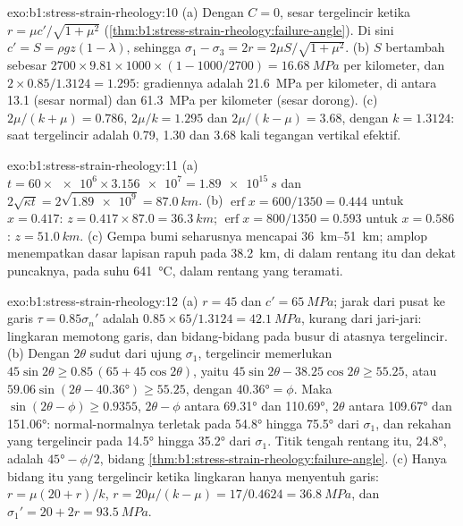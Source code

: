 \begin{solution}{exo:b1:stress-strain-rheology:10}
(a) Dengan $C = 0$, sesar tergelincir ketika $r = \mu c'/\sqrt{1+\mu^2}$
(\cref{thm:b1:stress-strain-rheology:failure-angle}). Di sini $c' = S =
\rho g z(1-\lambda)$, sehingga $\sigma_1 - \sigma_3 = 2r = 2\mu S/\sqrt{1+\mu^2}$.
(b) $S$ bertambah sebesar $2700\times9.81\times1000\times(1 - 1000/2700) =
\qty{16.68}{MPa}$ per kilometer, dan $2\times0.85/1.3124 = 1.295$: gradiennya
adalah \qty{21.6}{MPa} per kilometer, di antara \num{13.1} (sesar normal) dan
\qty{61.3}{MPa} per kilometer (sesar dorong). (c) $2\mu/(k+\mu) = 0.786$,
$2\mu/k = 1.295$ dan $2\mu/(k-\mu) = 3.68$, dengan $k = 1.3124$:  saat tergelincir adalah 0.79, 1.30 dan 3.68 kali tegangan vertikal
efektif.
\end{solution}

\begin{solution}{exo:b1:stress-strain-rheology:11}
(a) $t = 60\times\num{e6}\times\num{3.156e7} = \qty{1.89e15}{s}$ dan
$2\sqrt{\kappa t} = 2\sqrt{\num{1.89e9}} = \qty{87.0}{km}$. (b)
$\operatorname{erf}x = 600/1350 = 0.444$ untuk $x = 0.417$: $z = 0.417\times87.0
= \qty{36.3}{km}$; $\operatorname{erf}x = 800/1350 = 0.593$ untuk $x = 0.586$:
$z = \qty{51.0}{km}$. (c) Gempa bumi seharusnya mencapai \qtyrange{36}{51}{km};
amplop menempatkan dasar lapisan rapuh pada \qty{38.2}{km}, di dalam rentang itu dan
dekat puncaknya, pada suhu \qty{641}{\degreeCelsius}, dalam rentang yang teramati.
\end{solution}

\begin{solution}{exo:b1:stress-strain-rheology:12}
(a) $r = 45$ dan $c' = \qty{65}{MPa}$; jarak dari pusat ke garis
$\tau = 0.85\sigma_n'$ adalah $0.85\times65/1.3124 = \qty{42.1}{MPa}$, kurang dari
jari-jari: lingkaran memotong garis, dan bidang-bidang pada busur di atasnya
tergelincir. (b) Dengan $2\theta$ sudut dari ujung $\sigma_1$, tergelincir memerlukan
$45\sin2\theta \ge 0.85\,(65 + 45\cos2\theta)$, yaitu
$45\sin2\theta - 38.25\cos2\theta \ge 55.25$, atau
$59.06\sin(2\theta - \ang{40.36}) \ge 55.25$, dengan $\ang{40.36} = \phi$.
Maka $\sin(2\theta - \phi) \ge 0.9355$, $2\theta - \phi$ antara \ang{69.31}
dan \ang{110.69}, $2\theta$ antara \ang{109.67} dan \ang{151.06}: normal-normalnya
terletak pada \ang{54.8} hingga \ang{75.5} dari $\sigma_1$, dan rekahan yang tergelincir
pada \ang{14.5} hingga \ang{35.2} dari $\sigma_1$. Titik tengah rentang itu,
\ang{24.8}, adalah $\ang{45} - \phi/2$, bidang
\cref{thm:b1:stress-strain-rheology:failure-angle}. (c) Hanya bidang itu yang tergelincir
ketika lingkaran hanya menyentuh garis: $r = \mu(20 + r)/k$, $r = 20\mu/(k -
\mu) = 17/0.4624 = \qty{36.8}{MPa}$, dan $\sigma_1' = 20 + 2r =
\qty{93.5}{MPa}$.
\end{solution}

